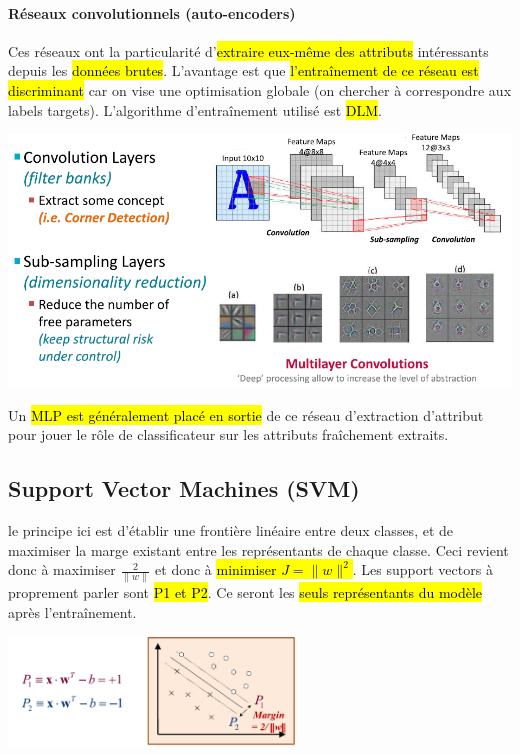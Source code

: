 \documentclass[letterpaper, 12pt]{article}
\newcommand{\alinea}{
\hspace*{0.5cm}}
\begin{document}
				\paragraph{Réseaux convolutionnels (auto-encoders)}
					\alinea Ces réseaux ont la particularité d'\hl{extraire eux-même des attributs} intéressants depuis les 
						\hl{données brutes}. L'avantage est que \hl{l'entraînement de ce réseau est discriminant} car on vise une 
						optimisation globale (on chercher à correspondre aux labels targets). L'algorithme d'entraînement 
						utilisé est \hl{DLM}.
						\begin{center}
							\includegraphics[width=\textwidth]{Images/cnn}
						\end{center}
					\alinea Un \hl{MLP est généralement placé en sortie} de ce réseau d'extraction d'attribut pour jouer le rôle de
						classificateur sur les attributs fraîchement extraits. 
		\subsection{Support Vector Machines (SVM)}
			\alinea le principe ici est d'établir une frontière linéaire entre deux classes, et de maximiser la marge existant entre les
				représentants de chaque classe. Ceci revient donc à maximiser $\frac{2}{\|w\|}$ et donc à \hl{minimiser $J = \|w\|^2$}.
				Les support vectors à proprement parler sont \hl{P1 et P2}. Ce seront les \hl{seuls représentants du modèle} après
				l'entraînement.
				\begin{center}
					\includegraphics[width=3in]{Images/svm}
				\end{center}
\end{document}
